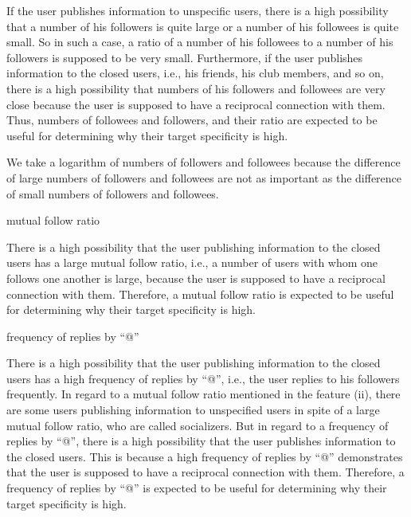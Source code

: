 If the user publishes information to unspecific users, there is a high
possibility that a number of his followers is quite large or a
number of his followees is quite small.  So in such a case, a ratio
of a number of his followees to a number of his followers is
supposed to be very small.  Furthermore, if the user publishes
information to the closed users, i.e., his friends, his club
members, and so on, there is a high possibility that numbers of his
followers and followees are very close because the user is supposed to
have a reciprocal connection with them.  Thus, numbers of followees and
followers, and their ratio are expected to be useful for determining why
their target specificity is high.

We take a logarithm of numbers of followers and followees because the
difference of large numbers of followers and followees are not as
important as the difference of small numbers of followers and followees.

\begin{description}
\bf {\item[(ii)] mutual follow ratio}
\end{description}

There is a high possibility that the user publishing information to the
closed users has a large mutual follow ratio, i.e., a number of users
with whom one follows one another is large, because the user is supposed
to have a reciprocal connection with them.  Therefore, a mutual follow
ratio is expected to be useful for determining why their target
specificity is high.

\begin{description}
\bf {\item[(iii)] frequency of replies by ``@''}
\end{description}

There is a high possibility that the user publishing information to the
closed users has a high frequency of replies by ``@'', i.e., the user
replies to his followers frequently. In regard to a mutual follow
ratio mentioned in the feature (ii), there are some users publishing information to
unspecified users in spite of a large mutual follow ratio, who are
called socializers.  But in regard to a frequency of replies by ``@'',
there is a high possibility that the
user publishes information to the closed users.  This is because a high
frequency of replies by ``@'' demonstrates that the user is supposed to
have a reciprocal connection with them.  Therefore, a frequency of
replies by ``@'' is expected to be useful for determining why their
target specificity is high.


